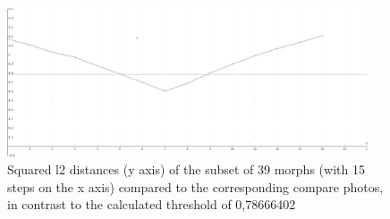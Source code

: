 \begin{figure}[htbp] 
	\centering
		\includegraphics[width=0.95\textwidth]{Resources/result39-90-10.jpg}
	\caption{Squared l2 distances (y axis) of the subset of 39 morphs (with 15 steps on the x axis) compared to the corresponding compare photos, in contrast to the calculated threshold of 0,78666402} 
	\label{fig:Result39-90-10}
\end{figure}